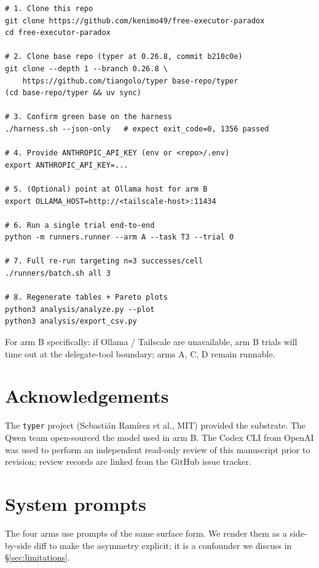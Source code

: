 \documentclass[11pt,a4paper]{article}
\begin{document}
\begin{verbatim}
# 1. Clone this repo
git clone https://github.com/kenimo49/free-executor-paradox
cd free-executor-paradox

# 2. Clone base repo (typer at 0.26.8, commit b210c0e)
git clone --depth 1 --branch 0.26.8 \
    https://github.com/tiangolo/typer base-repo/typer
(cd base-repo/typer && uv sync)

# 3. Confirm green base on the harness
./harness.sh --json-only   # expect exit_code=0, 1356 passed

# 4. Provide ANTHROPIC_API_KEY (env or <repo>/.env)
export ANTHROPIC_API_KEY=...

# 5. (Optional) point at Ollama host for arm B
export OLLAMA_HOST=http://<tailscale-host>:11434

# 6. Run a single trial end-to-end
python -m runners.runner --arm A --task T3 --trial 0

# 7. Full re-run targeting n=3 successes/cell
./runners/batch.sh all 3

# 8. Regenerate tables + Pareto plots
python3 analysis/analyze.py --plot
python3 analysis/export_csv.py
\end{verbatim}

For arm B specifically: if Ollama / Tailscale are unavailable, arm B trials will time out at the delegate-tool boundary; arms A, C, D remain runnable.

\section*{Acknowledgements}

The \texttt{typer} project (Sebastián Ramírez et al., MIT) provided the substrate. The Qwen team open-sourced the model used in arm B. The Codex CLI from OpenAI was used to perform an independent read-only review of this manuscript prior to revision; review records are linked from the GitHub issue tracker.



\appendix

\section{System prompts}
\label{app:system-prompts}

The four arms use prompts of the same surface form. We render them as a side-by-side diff to make the asymmetry explicit; it is a confounder we discuss in \S\ref{sec:limitations}.
\end{document}
